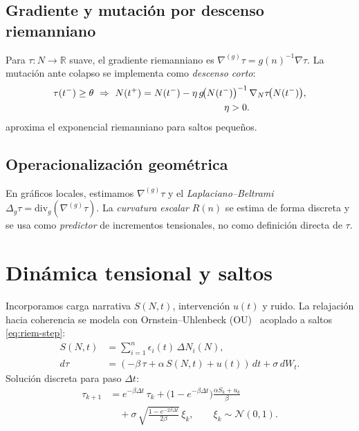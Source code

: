 \documentclass[10pt,a4paper,twocolumn]{article}
\theoremstyle{definition}
\theoremstyle{plain}
\begin{document}
\subsection{Gradiente y mutación por descenso riemanniano}
Para \(\tau:N\to\mathbb{R}\) suave, el gradiente riemanniano es \(\nabla^{(g)}\tau = g(n)^{-1}\nabla\tau\). La mutación ante colapso se implementa como \emph{descenso corto}:
\begin{equation}
\begin{aligned}
\tau(t^-)\ge \theta \ \Rightarrow\ 
N(t^+) &= N(t^-) - \eta\, g\!\big(N(t^-)\big)^{-1}\, \nabla_{N}\tau\!\big(N(t^-)\big),\\
&\hspace{8.6em} \eta>0.
\end{aligned}
\label{eq:riem-step}
\end{equation}
\noindent
{} aproxima el exponencial riemanniano para saltos pequeños.

\subsection{Operacionalización geométrica}
En gráficos locales, estimamos \(\nabla^{(g)}\tau\) y el \emph{Laplaciano--Beltrami} \(\Delta_g\tau=\mathrm{div}_g(\nabla^{(g)}\tau)\). La \emph{curvatura escalar} \(R(n)\) se estima de forma discreta y se usa como \emph{predictor} de incrementos tensionales, no como definición directa de \(\tau\).

\section{Dinámica tensional y saltos}
\label{sec:modelo}
Incorporamos carga narrativa \(S(N,t)\), intervención \(u(t)\) y ruido. La relajación hacia coherencia se modela con Ornstein--Uhlenbeck (OU)~\cite{uhlenbeck1930,nelson1967} acoplado a saltos \eqref{eq:riem-step}:
\begin{align}
S(N,t) &= \sum_{i=1}^{n}\epsilon_i(t)\,\Delta N_i(N), \label{eq:S}\\
d\tau &= \left(-\beta\,\tau+\alpha\,S(N,t)+u(t)\right)\,dt+\sigma\, dW_t. \label{eq:ou}
\end{align}
Solución discreta para paso \(\Delta t\):
\begin{equation}
\begin{aligned}
\tau_{k+1} &= e^{-\beta\Delta t}\,\tau_k 
+ \bigl(1-e^{-\beta\Delta t}\bigr)\frac{\alpha S_k + u_k}{\beta} \\
&\quad + \sigma\,\sqrt{\frac{1-e^{-2\beta\Delta t}}{2\beta}}\,\xi_k,
\qquad \xi_k\sim\mathcal{N}(0,1).
\end{aligned}
\label{eq:ou_discreto}
\end{equation}
\end{document}
